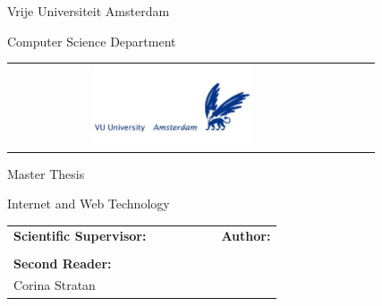 \begin{titlepage}
	\begin{center}
		{\Large Vrije Universiteit Amsterdam}
		\par\vspace*{1mm}
		{\Large Computer Science Department}
		\par\vspace*{0mm}
		\begin{table}[h]
        	\begin{center}
				\begin{tabular}{cccc}
                    
					\includegraphics[width=0.50\textwidth]{src/img/branding/vrije}
            	\end{tabular}
		\end{center}
		\end{table}
		
		\par\vspace*{25mm}
		
		\textbf{{\Huge \VARtitleen }}
		\par\vspace*{7mm}
		{\Large Master Thesis}\\
		\par\vspace*{2mm}
		{\Large Internet and Web Technology}
		\par\vspace*{15mm}
		\begin{table}[h]
        	\begin{center}
				\begin{tabular}{lcccccl}
					\Large \textbf{\Large Scientific Supervisor:}
					\vspace*{1mm} &&&&&& \Large \textbf{\Large Author:}\vspace*{1mm} \\
					\Large \VARadviser \vspace*{1mm} &&&&&& \Large \VARauthor \vspace*{1mm}\\
					\Large \textbf{\Large Second Reader:} \vspace*{1mm} &&&&&&  \vspace*{1mm} \\
					\Large Corina Stratan &&&&&& 
				\end{tabular}
		\end{center}
		\end{table}

		\par\vspace*{35mm}
		\Large \VARtitlefooteren
	\end{center}
\end{titlepage}

